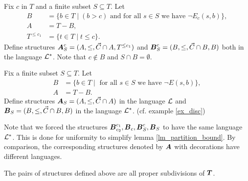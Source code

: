 \begin{Definition}
  Fix $c$ in $T$ and  a finite subset $S \subseteq T$. Let
  \begin{align*}
    B &= \{b \in T \mid (b > c) \text{ and for all $s \in S$ we have } \neg E_c(s, b)\}, \\
    A &= T - B, \\
    T^{\leq c_1} &= \{t \in T \mid t \leq c\}.
  \end{align*}
  Define structures $\operatorname{\boldsymbol A}^{c}_{S} = (A, \leq, \vec C\cap A, T^{\leq c_1})$ and $\operatorname{\boldsymbol B}^{c}_{S} = (B, \leq, \vec C\cap B, B)$ both in the language $\mathcal L^*$.
  Note that $c \notin B$ and $S \cap B = \emptyset$.
\end{Definition}

\begin{Definition}
  Fix  a finite subset $S \subseteq T$. Let
  \begin{align*}
    B &= \{b \in T \mid \text{ for all $s \in S$ we have } \neg E(s, b)\}, \\
    A &= T - B.
  \end{align*}
  Define structures $\operatorname{\boldsymbol A}_{S} = (A, \leq, \vec C \cap A)$ in the language $\mathcal L$ and $\operatorname{\boldsymbol B}_{S} = (B, \leq, \vec C\cap B, B)$ in the language $\mathcal L^*$.
  (cf. example \ref{ex_disc})
\end{Definition}

Note that we forced the structures $\operatorname{\boldsymbol B}^{c_1}_{c_2}, \operatorname{\boldsymbol B}_c, \operatorname{\boldsymbol B}^{c}_{S}, \operatorname{\boldsymbol B}_{S}$ to have the same language $\mathcal L^*$.
This is done for uniformity to simplify lemma \ref{lm_partition_bound}.
By comparison, the corresponding structures denoted by $\operatorname{\boldsymbol A}$ with decorations have different languages.

\begin{Lemma} \label{subdivide}
  The pairs of structures defined above are all proper subdivisions of $\operatorname{\boldsymbol T}$.
\end{Lemma}

